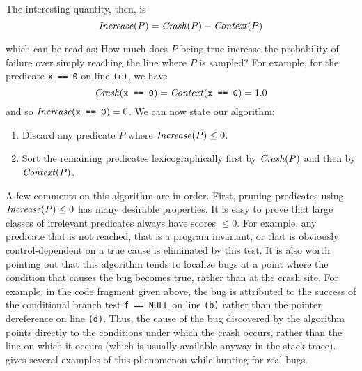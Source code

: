 The interesting quantity, then, is
\begin{equation}
 \mbox{\textit{Increase}}(P) = \mbox{\textit{Crash}}(P) - \mbox{\textit{Context}}(P) \label{eqn:1}
\end{equation}

which can be read as: How much does $P$ being true increase the probability of failure
over simply reaching the line where $P$ is sampled?  For example, for the predicate {\tt x == 0} on line {\tt (c)},
we have
\[\mbox{\textit{Crash}}(\mbox{\tt x == 0}) = \mbox{\textit{Context}}(\mbox{\tt x == 0}) = 1.0 \]
and so $\mbox{\textit{Increase}}(\mbox{\tt x == 0}) = 0$.
We can now state our algorithm:
\begin{enumerate}
\item Discard any predicate $P$ where $\mbox{\textit{Increase}}(P) \leq 0$.

\item Sort the remaining predicates lexicographically first by $\mbox{\textit{Crash}}(P)$ and then by $\mbox{\textit{Context}}(P)$.
\end{enumerate}

A few comments on this algorithm are in order.  First, pruning
predicates using $\mbox{\textit{Increase}}(P) \leq 0$ has many desirable
properties.  It is easy to prove that large classes of irrelevant
predicates always have scores $\leq 0$.  For example, any predicate
that is not reached, that is a program invariant, or that is obviously
control-dependent on a true cause is eliminated by this test.  It is
also worth pointing out that this algorithm tends to localize bugs at
a point where the condition that causes the bug becomes true, rather than at
the crash site.  For example, in the code fragment given above, the bug is
attributed to the success of the conditional branch test {\tt f ==
NULL} on line {\tt (b)} rather than the pointer dereference on line
{\tt (d)}.  Thus, the cause of the bug discovered by the algorithm
points directly to the conditions under which the crash occurs, rather than
the line on which it occurs (which is usually available anyway in the
stack trace).  gives several examples
of this phenomenon while hunting for real bugs.


